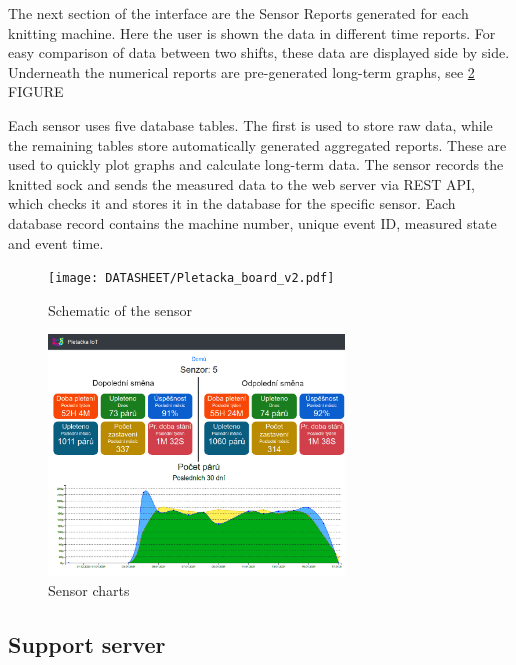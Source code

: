 \documentclass[12pt, a4paper]{article}
\begin{document}
The next section of the interface are the Sensor Reports generated for each knitting machine.
Here the user is shown the data in different time reports.
For easy comparison of data between two shifts, these data are displayed side by side.
Underneath the numerical reports are pre-generated long-term graphs, see \ref{fig:webSenzory} FIGURE

Each sensor uses five database tables. The first is used to store raw data, while the remaining tables store automatically generated aggregated reports.
These are used to quickly plot graphs and calculate long-term data.
The sensor records the knitted sock and sends the measured data to the web server via REST API, which checks it and stores it in the database for the specific sensor.
Each database record contains the machine number, unique event ID, measured state and event time.

% 
\begin{figure}[htbp]
    \centering
    \texttt{[image: DATASHEET/Pletacka\_board\_v2.pdf]}
    \caption{Schematic of the sensor}
    \label{fig:Schemav1}
\end{figure}


\begin{figure}[t]
    \centering
    \includegraphics[width=0.7\textwidth]{img/prehled.png}
    \caption{Sensor charts}
    \label{fig:webSenzory}
\end{figure}


\subsection*{Support server}
\end{document}

